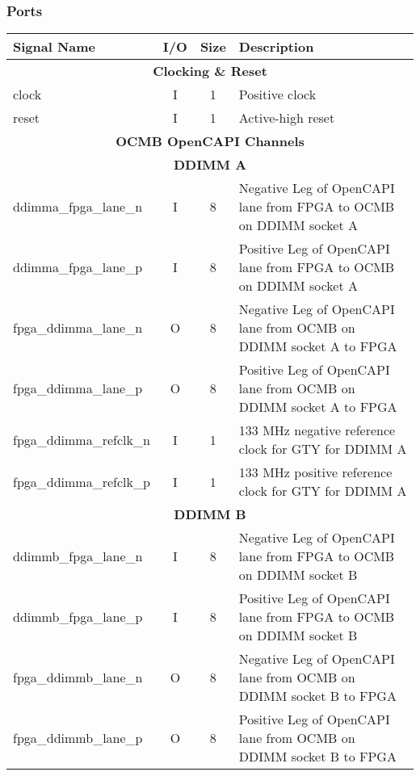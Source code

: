 \subsubsection{Ports}
\begin{center}
  \begin{longtable}{ l | c | c | p{.55\linewidth} }
    Signal Name                & I/O & Size & Description \\ \hline
    \endhead
    \multicolumn{4}{c}{\textbf{Clocking \& Reset}} \\ \hline
    clock                      & I   & 1    & Positive clock \\ \hline
    reset                      & I   & 1    & Active-high reset \\ \hline
    \multicolumn{4}{c}{\textbf{OCMB OpenCAPI Channels}} \\ \hline
    \multicolumn{4}{c}{\textbf{DDIMM A}} \\ \hline
    ddimma\_fpga\_lane\_n      & I   & 8    & Negative Leg of OpenCAPI lane from FPGA to OCMB on DDIMM socket A \\ \hline
    ddimma\_fpga\_lane\_p      & I   & 8    & Positive Leg of OpenCAPI lane from FPGA to OCMB on DDIMM socket A \\ \hline
    fpga\_ddimma\_lane\_n      & O   & 8    & Negative Leg of OpenCAPI lane from OCMB on DDIMM socket A to FPGA \\ \hline
    fpga\_ddimma\_lane\_p      & O   & 8    & Positive Leg of OpenCAPI lane from OCMB on DDIMM socket A to FPGA \\ \hline
    fpga\_ddimma\_refclk\_n    & I   & 1    & 133 MHz negative reference clock for GTY for DDIMM A \\ \hline
    fpga\_ddimma\_refclk\_p    & I   & 1    & 133 MHz positive reference clock for GTY for DDIMM A \\ \hline
    \multicolumn{4}{c}{\textbf{DDIMM B}} \\ \hline
    ddimmb\_fpga\_lane\_n      & I   & 8    & Negative Leg of OpenCAPI lane from FPGA to OCMB on DDIMM socket B \\ \hline
    ddimmb\_fpga\_lane\_p      & I   & 8    & Positive Leg of OpenCAPI lane from FPGA to OCMB on DDIMM socket B \\ \hline
    fpga\_ddimmb\_lane\_n      & O   & 8    & Negative Leg of OpenCAPI lane from OCMB on DDIMM socket B to FPGA \\ \hline
    fpga\_ddimmb\_lane\_p      & O   & 8    & Positive Leg of OpenCAPI lane from OCMB on DDIMM socket B to FPGA \\ \hline

\end{longtable}
\end{center}
